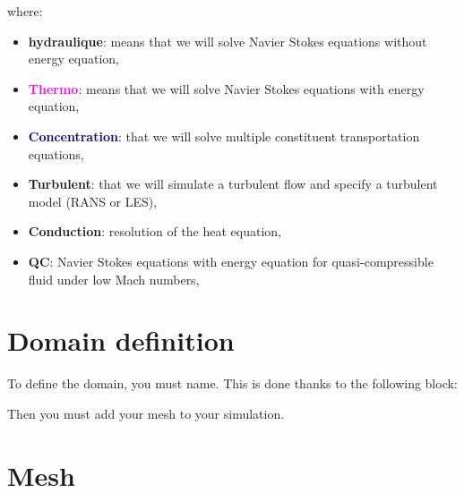 where:
\begin{itemize}
\item \textbf{hydraulique}: means that we will solve Navier Stokes equations without energy equation,
\item \textbf{\textcolor{magenta}{Thermo}}: means that we will solve Navier Stokes equations with energy equation,
\item \textbf{\textcolor{darkblue}{Concentration}}: that we will solve multiple constituent transportation equations,
\item \textbf{\textcolor{Greeen}{Turbulent}}: that we will simulate a turbulent flow and specify a turbulent model (RANS or LES),
\item \textbf{Conduction}: resolution of the heat equation,
\item \textbf{QC}: Navier Stokes equations with energy equation for quasi-compressible fluid under low Mach numbers,
\end{itemize}





\section{Domain definition}
To define the domain, you must name. This is done thanks to the following block:

    \begin{center}
    \end{center}

Then you must add your mesh to your simulation.




\section{Mesh} \label{Mesh}

